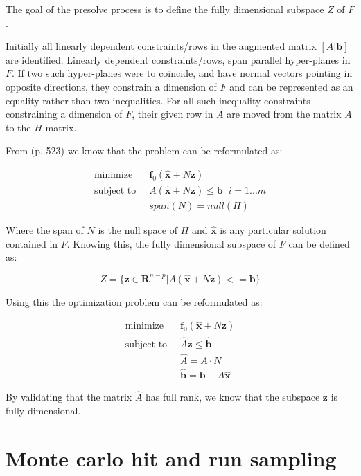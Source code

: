 \documentclass[11pt,a4paper,english]{article}
\begin{document}
The goal of the presolve process is to define the fully dimensional subspace $Z$ of $F$. 

Initially all linearly dependent constraints/rows in the augmented matrix $[ A|\mathbf{b}] $ are identified. Linearly dependent constraints/rows, span parallel hyper-planes in $F$. If two such hyper-planes were to coincide, and have normal vectors pointing in opposite directions, they constrain a dimension of $F$ and can be represented as an equality rather than two inequalities. For all such inequality constraints constraining a dimension of $F$, their given row in $A$ are moved from the matrix $A$ to the $H$ matrix.

From \cite{ConvexOpimization} (p. 523) we know that the problem can be reformulated as: 

\begin{align}
\text{minimize} \;&\; \mathbf{f}_0(\mathbf{\hat{x}} + N \mathbf{z})  \\
\text{subject to} \; &\; A(\mathbf{\hat{x}} + N \mathbf{z}) \leq \mathbf{b} \; \; i=1...m\\
\;            &\;  span(N) = null(H)
\end{align}

Where the span of $N$ is the null space of $H$ and $\mathbf{\hat{x}}$ is any particular solution contained in $F$.
Knowing this, the fully dimensional subspace of $F$ can be defined as:

\begin{equation}
Z = \{\mathbf{z} \in \mathbf{R}^{n-p} | A(\mathbf{\hat{x}} +  N \mathbf{z}) <= \mathbf{b}  \}
\end{equation}

Using this the optimization problem can be reformulated as:

\begin{align}
	\text{minimize} \;&\; \mathbf{f}_0(\mathbf{\hat{x}} + N \mathbf{z})  \\
	\text{subject to} \; &\; \hat{A}\mathbf{z} \leq \mathbf{\hat{b}} \label{eq:sub_problem}\\
	\;            &\;  \hat{A} = A \cdot N \\ 
	\;			& \; \mathbf{\hat{b}} = \mathbf{b}- A\mathbf{\hat{x}}
\end{align}

By validating that the matrix $\hat{A}$ has full rank, we know that the subspace $\mathbf{z}$ is fully dimensional. 

\section{Monte carlo hit and run sampling}
\end{document}
